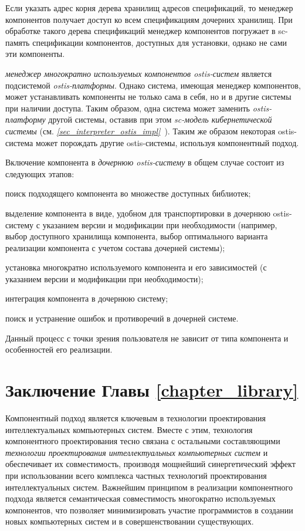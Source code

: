 Если указать адрес корня дерева хранилищ адресов спецификаций, то менеджер компонентов получает доступ ко всем спецификациям дочерних хранилищ. При обработке такого дерева спецификаций менеджер компонентов погружает в sc-память спецификации компонентов, доступных для установки, однако не сами эти компоненты.

\textit{менеджер многократно используемых компонентов ostis-систем} является  подсистемой \textit{ostis-платформы}. Однако система, имеющая менеджер компонентов, может устанавливать компоненты не только сама в себя, но и в другие системы при наличии доступа. Таким образом, одна система может заменить \textit{ostis-платформу} другой системы, оставив при этом \textit{sc-модель кибернетической системы} (см. \textit{\ref{sec_interpreter_ostis_impl}~}). Таким же образом некоторая ostis-система может порождать другие ostis-системы, используя компонентный подход.

Включение компонента в \textit{дочернюю ostis-систему} в общем случае состоит из следующих этапов:
\begin{textitemize}
	\item поиск подходящего компонента во множестве доступных библиотек;
	\item выделение компонента в виде, удобном для транспортировки в дочернюю ostis-систему с указанием версии и модификации при необходимости (например, выбор доступного хранилища компонента, выбор оптимального варианта реализации компонента с учетом состава дочерней системы);
	\item установка многократно используемого компонента и его зависимостей (с указанием версии и модификации при необходимости);
	\item интеграция компонента в дочернюю систему;
	\item поиск и устранение ошибок и противоречий в дочерней системе.
\end{textitemize}

Данный процесс с точки зрения пользователя не зависит от типа компонента и особенностей его реализации.

\section*{Заключение Главы \ref{chapter_library}}
\label{ostis_library_conclusion}

Компонентный подход является ключевым в технологии проектирования интеллектуальных компьютерных систем. Вместе с этим, технология компонентного проектирования тесно связана с остальными составляющими \textit{технологии проектирования интеллектуальных компьютерных систем} и обеспечивает их совместимость, производя мощнейший синергетический эффект при использовании всего комплекса частных технологий проектирования интеллектуальных систем. Важнейшим принципом в реализации компонентного подхода является семантическая совместимость многократно используемых компонентов, что позволяет минимизировать участие программистов в создании новых компьютерных систем и в совершенствовании существующих.

